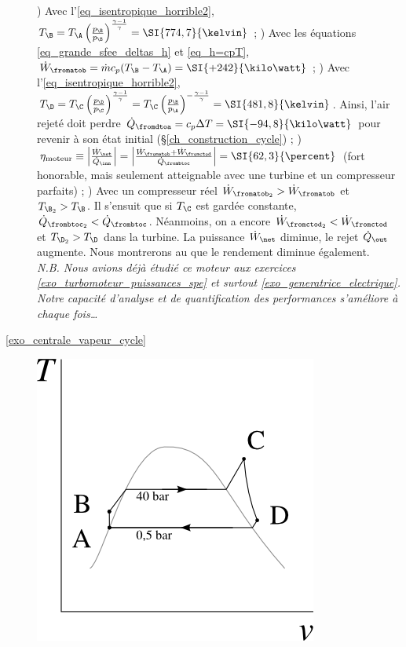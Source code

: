 \begin{description}
			) Avec l’\cref{eq_isentropique_horrible2}, $T_\B = T_\A \left(\frac{p_\B}{p_\B}\right)^{\frac{\gamma - 1}{\gamma}} = \SI{774,7}{\kelvin}$ ;
			) Avec les équations \ref{eq_grande_sfee_deltas_h} et \ref{eq_h=cpT}, $\dot W_\fromatob = \dot m c_p (T_\B - T_\A) = \SI{+242}{\kilo\watt}$  ;
			) Avec l’\cref{eq_isentropique_horrible2}, $T_\D = T_\C \left(\frac{p_\D}{p_\C}\right)^{\frac{\gamma - 1}{\gamma}} = T_\C \left(\frac{p_\B}{p_\A}\right)^{-\frac{\gamma - 1}{\gamma}} = \SI{481,8}{\kelvin}$. Ainsi, l’air rejeté doit perdre $\dot Q_\fromdtoa = c_p \Delta T = \SI{-94,8}{\kilo\watt}$ pour revenir à son état initial (\S\ref{ch_construction_cycle}) ;
			) $\eta_\text{moteur} \equiv \left|\frac{\dot W_\net}{\dot Q_\inn} \right| = \left|\frac{\dot W_\fromatob + \dot W_\fromctod}{\dot Q_\frombtoc} \right| = \SI{62,3}{\percent} $ (fort honorable, mais seulement atteignable avec une turbine et un compresseur parfaits) ;
			) Avec un compresseur réel $\dot W_{\fromatob_2} > \dot W_\fromatob$ et $T_{\B_2} > T_\B$.
						Il s’ensuit que si $T_\C$ est gardée constante, $\dot Q_{\frombtoc_2} < \dot Q_\frombtoc$.
						Néanmoins, on a encore $\dot W_{\fromctod_2} < \dot W_\fromctod$ et $T_{\D_2} > T_\D$ dans la turbine. La puissance $\dot W_\net$ diminue, le rejet $\dot Q_\out$ augmente. Nous montrerons au \courssept que le rendement diminue également.\\
					\textit{N.B. Nous avions déjà étudié ce moteur aux exercices \ref{exo_turbomoteur_puissances_spe} et surtout \ref{exo_generatrice_electrique}. Notre capacité d’analyse et de quantification des performances s’améliore à chaque fois…}		
	\item [\ref{exo_centrale_vapeur_cycle}]
			\includegraphics[height=\solutiondiagramwidth]{images/exo_sol_tv_moteur_vapeur.png}

\end{description}
